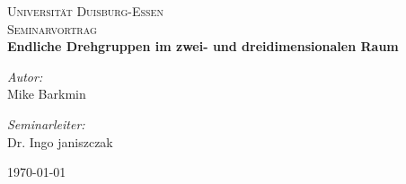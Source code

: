 
\begin{titlepage}
\begin{center}


\textsc{\LARGE Universität Duisburg-Essen}\\[1.5cm]

\textsc{\Large Seminarvortrag}\\[0.5cm]

{ \huge \bfseries Endliche Drehgruppen im zwei- und dreidimensionalen Raum \\[0.4cm] }

\begin{minipage}{0.4\textwidth}
\begin{flushleft} \large
\emph{Autor:}\\
Mike Barkmin
\end{flushleft}
\end{minipage}
\begin{minipage}{0.4\textwidth}
\begin{flushright} \large
\emph{Seminarleiter:} \\
Dr. Ingo janiszczak
\end{flushright}
\end{minipage}

\vfill

{\large \today}

\end{center}
\end{titlepage}
